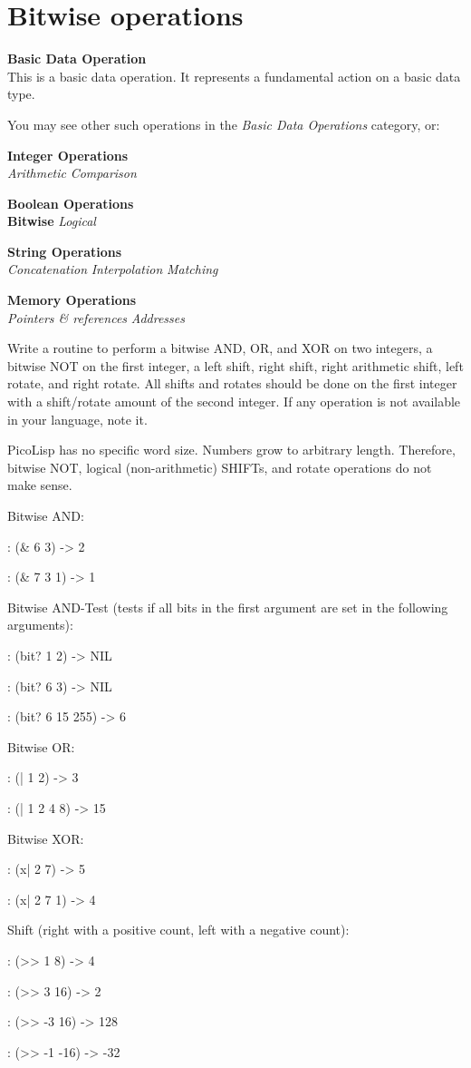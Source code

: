 \pagebreak{}
\section*{Bitwise operations}


\textbf{Basic Data Operation}\\ This is a basic data operation. It
represents a fundamental action on a basic data type.

You may see other such operations in the \emph{Basic Data Operations}
category, or:

\textbf{Integer Operations} \\
\emph{Arithmetic} \textbar{} \emph{Comparison}

\textbf{Boolean Operations} \\ \textbf{Bitwise} \textbar{} \emph{Logical}

\textbf{String Operations} \\
\emph{Concatenation} \textbar{} 
\emph{Interpolation} \textbar{}
\emph{Matching}

\textbf{Memory Operations} \\
\emph{Pointers \& references}
\textbar{} \emph{Addresses}

Write a routine to perform a bitwise AND, OR, and XOR on two integers, a
bitwise NOT on the first integer, a left shift, right shift, right
arithmetic shift, left rotate, and right rotate. All shifts and rotates
should be done on the first integer with a shift/rotate amount of the
second integer. If any operation is not available in your language, note
it.



\begin{wideverbatim}

PicoLisp has no specific word size. Numbers grow to arbitrary length. Therefore,
bitwise NOT, logical (non-arithmetic) SHIFTs, and rotate operations do not make
sense.

Bitwise AND:

: (\& 6 3)
-> 2

: (\& 7 3 1)
-> 1

Bitwise AND-Test (tests if all bits in the first argument are set in the
following arguments):

: (bit? 1 2)
-> NIL

: (bit? 6 3)
-> NIL

: (bit? 6 15 255)
-> 6

Bitwise OR:

: (| 1 2)
-> 3

: (| 1 2 4 8)
-> 15

Bitwise XOR:

: (x| 2 7)
-> 5

: (x| 2 7 1)
-> 4

Shift (right with a positive count, left with a negative count):

: (>> 1 8)
-> 4

: (>> 3 16)
-> 2

: (>> -3 16)
-> 128

: (>> -1 -16)
-> -32

\end{wideverbatim}


